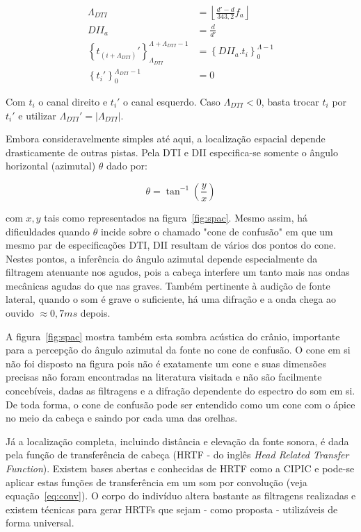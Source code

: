 \begin{equation}\label{eq:locImpl}
\begin{split}
\Lambda_{DTI} & = \left \lfloor \frac{d'-d}{343,2}  f_a \right \rfloor \\
DII_a & = \frac{d}{d'} \\
\left\{t_{(i+\Lambda_{DTI})}'\right\}_{\Lambda_{DTI}}^{\Lambda+\Lambda_{DTI}-1} & =\left\{DII_a . t_i\right\}_0^{\Lambda-1} \\
\left\{t_i'\right\}_0^{\Lambda_{DTI}-1} & = 0
\end{split}
\end{equation}

Com $t_i$ o canal direito e $t_i'$ o canal esquerdo. Caso $\Lambda_{DTI} < 0 $, basta trocar $t_i$ por $t_i'$  e utilizar $\Lambda_{DTI}'= | \Lambda_{DTI} | $.

Embora consideravelmente simples até aqui, a localização espacial depende drasticamente de outras pistas. Pela
DTI e DII especifica-se somente o ângulo horizontal (azimutal) $\theta$ dado por:

\begin{equation}\label{eq:angulo}
\theta=\tan^{-1}\left ( \frac{y}{ x }  \right )
\end{equation}

com $x,y$ tais como representados na figura~\ref{fig:spac}. Mesmo assim, há dificuldades quando $\theta$ incide sobre o chamado "cone de confusão" em que um mesmo par de especificações DTI, DII resultam de vários dos pontos 
do cone. Nestes pontos, a inferência do ângulo azimutal depende especialmente da filtragem atenuante nos agudos, pois a cabeça interfere um tanto mais nas ondas mecânicas agudas do que nas graves.\cite{Heeger,hrtf}  Também pertinente à audição de fonte lateral, quando o som é grave o suficiente, há uma difração e a onda chega ao ouvido $\approx 0,7ms$ depois.\cite{floEsp}

A figura~\ref{fig:spac} mostra também esta sombra acústica do crânio, importante para a percepção do ângulo azimutal da fonte no cone de confusão. O cone em si não foi disposto na figura pois não é exatamente um cone e suas dimensões precisas não foram encontradas na literatura visitada e não são facilmente concebíveis, dadas as filtragens e a difração dependente do espectro do som em si. De toda forma, o cone de confusão pode ser entendido como um cone com o ápice no meio da cabeça e saindo por cada uma das orelhas.\cite{hrtf}

Já a localização completa, incluindo distância e elevação da fonte sonora, é dada pela função de transferência de cabeça (HRTF - do inglês \emph{Head Related Transfer Function}).\cite{hrtf} Existem bases abertas e conhecidas de HRTF como a CIPIC e pode-se aplicar estas funções de transferência em um som por convolução (veja equação~\ref{eq:conv}).\cite{CIPIC} O corpo do indivíduo altera bastante as filtragens realizadas e existem técnicas para gerar HRTFs que sejam - como proposta - utilizáveis de forma universal.\cite{lazaSPA} 

